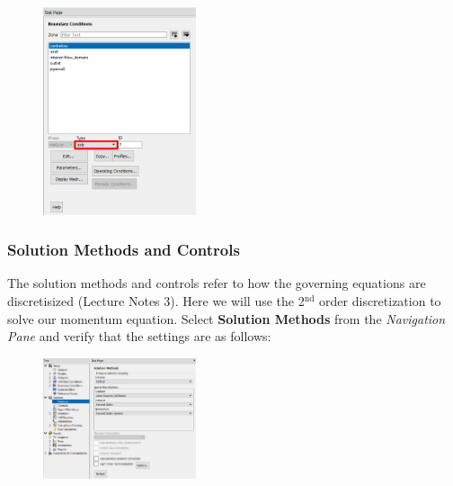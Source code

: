 \documentclass[11pt,a4paper,oneside]{scrartcl}
\newcommand\bfr[1]{\textcolor[rgb]{1,0.00,0.00}{\textbf{\textsf{#1}}}}
\begin{document}
\begin{enumerate}
\begin{figure}[H]
    \begin{center}
    \includegraphics[width=0.4\textwidth,clip]{BC_centreline.png}
    \end{center}
    \end{figure}
\end{enumerate}

\subsubsection{Solution Methods and Controls}

The solution methods and controls refer to how the governing equations are discretisized (Lecture Notes 3). Here we will use the 2$^\mathrm{nd}$ order discretization to solve our momentum equation. Select \bfr{Solution Methods} from the \emph{Navigation Pane} and verify that the settings are as follows:
\begin{figure}[H]
\begin{center}
\includegraphics[width=0.4\textwidth,clip]{solution_methods.png}
\end{center}
\end{figure}
\end{document}
